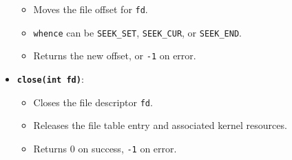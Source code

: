 \documentclass[8pt,twocolumn]{article}
\begin{document}
\begin{itemize}
\vspace{-0.5em}
    \begin{itemize}
      \setlength{\itemsep}{0pt} %
      \setlength{\parskip}{0pt}
      \item Moves the file offset for \texttt{fd}.
      \item \texttt{whence} can be \texttt{SEEK\_SET}, \texttt{SEEK\_CUR}, or \texttt{SEEK\_END}.
      \item Returns the new offset, or \texttt{-1} on error.
    \end{itemize}
\vspace{-0.5em}
  \item \textbf{\texttt{close(int fd)}}:
\vspace{-0.5em}
    \begin{itemize}
      \setlength{\itemsep}{0pt} %
      \setlength{\parskip}{0pt}
      \item Closes the file descriptor \texttt{fd}.
      \item Releases the file table entry and associated kernel resources.
      \item Returns 0 on success, \texttt{-1} on error.
    \end{itemize}
\vspace{-0.6em}
\end{itemize}
\end{document}
